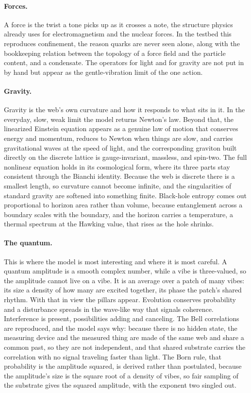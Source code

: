 \paragraph{Forces.}
A force is the twist a tone picks up as it crosses a note, the structure physics already uses
for electromagnetism and the nuclear forces. In the testbed this reproduces confinement, the
reason quarks are never seen alone, along with the bookkeeping relation between the topology of
a force field and the particle content, and a condensate. The operators for light and for
gravity are not put in by hand but appear as the gentle-vibration limit of the one action.

\paragraph{Gravity.}
Gravity is the web's own curvature and how it responds to what sits in it. In the everyday,
slow, weak limit the model returns Newton's law. Beyond that, the linearized Einstein equation
appears as a genuine law of motion that conserves energy and momentum, reduces to Newton when
things are slow, and carries gravitational waves at the speed of light, and the corresponding
graviton built directly on the discrete lattice is gauge-invariant, massless, and spin-two. The
full nonlinear equation holds in its cosmological form, where its three parts stay consistent
through the Bianchi identity. Because the web is discrete there is a smallest length, so
curvature cannot become infinite, and the singularities of standard gravity are softened into
something finite. Black-hole entropy comes out proportional to horizon area rather than volume,
because entanglement across a boundary scales with the boundary, and the horizon carries a
temperature, a thermal spectrum at the Hawking value, that rises as the hole shrinks.

\paragraph{The quantum.}
This is where the model is most interesting and where it is most careful. A quantum amplitude is
a smooth complex number, while a vibe is three-valued, so the amplitude cannot live on a vibe.
It is an average over a patch of many vibes: its size a density of how many are excited
together, its phase the patch's shared rhythm. With that in view the pillars appear. Evolution
conserves probability and a disturbance spreads in the wave-like way that signals coherence.
Interference is present, possibilities adding and canceling. The Bell correlations are
reproduced, and the model says why: because there is no hidden state, the measuring device and
the measured thing are made of the same web and share a common past, so they are not
independent, and that shared substrate carries the correlation with no signal traveling faster
than light. The Born rule, that probability is the amplitude squared, is derived rather than
postulated, because the amplitude's size is the square root of a density of vibes, so fair
sampling of the substrate gives the squared amplitude, with the exponent two singled out.

